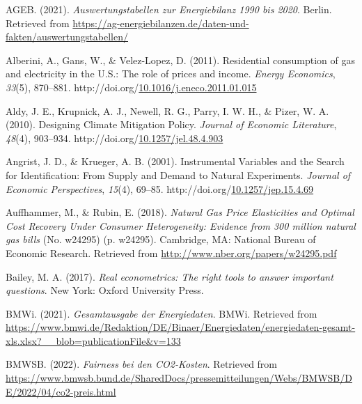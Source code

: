 \documentclass[12pt,twoside]{reedthesis}
\newlength{\cslhangindent}
\newenvironment{CSLReferences}[2] %
 {%
  \setlength{\parindent}{0pt}
  \ifodd #1 \everypar{\setlength{\hangindent}{\cslhangindent}}\ignorespaces\fi
  \ifnum #2 > 0
  \setlength{\parskip}{#2\baselineskip}
  \fi
 }%
 {}
\begin{document}
\hypertarget{refs}{}
\begin{CSLReferences}{1}{0}
\leavevmode{}%
AGEB. (2021). \emph{Auswertungstabellen zur Energiebilanz 1990 bis 2020}. Berlin. Retrieved from \url{https://ag-energiebilanzen.de/daten-und-fakten/auswertungstabellen/}

\leavevmode{}%
Alberini, A., Gans, W., \& Velez-Lopez, D. (2011). Residential consumption of gas and electricity in the U.S.: The role of prices and income. \emph{Energy Economics}, \emph{33}(5), 870--881. http://doi.org/\href{https://doi.org/10.1016/j.eneco.2011.01.015}{10.1016/j.eneco.2011.01.015}

\leavevmode{}%
Aldy, J. E., Krupnick, A. J., Newell, R. G., Parry, I. W. H., \& Pizer, W. A. (2010). Designing Climate Mitigation Policy. \emph{Journal of Economic Literature}, \emph{48}(4), 903--934. http://doi.org/\href{https://doi.org/10.1257/jel.48.4.903}{10.1257/jel.48.4.903}

\leavevmode{}%
Angrist, J. D., \& Krueger, A. B. (2001). Instrumental Variables and the Search for Identification: From Supply and Demand to Natural Experiments. \emph{Journal of Economic Perspectives}, \emph{15}(4), 69--85. http://doi.org/\href{https://doi.org/10.1257/jep.15.4.69}{10.1257/jep.15.4.69}

\leavevmode{}%
Auffhammer, M., \& Rubin, E. (2018). \emph{Natural Gas Price Elasticities and Optimal Cost Recovery Under Consumer Heterogeneity: Evidence from 300 million natural gas bills} (No. w24295) (p. w24295). Cambridge, MA: National Bureau of Economic Research. Retrieved from \url{http://www.nber.org/papers/w24295.pdf}

\leavevmode{}%
Bailey, M. A. (2017). \emph{Real econometrics: The right tools to answer important questions}. New York: Oxford University Press.

\leavevmode{}%
BMWi. (2021). \emph{Gesamtausgabe der Energiedaten}. BMWi. Retrieved from \url{https://www.bmwi.de/Redaktion/DE/Binaer/Energiedaten/energiedaten-gesamt-xls.xlsx?__blob=publicationFile\&v=133}

\leavevmode{}%
BMWSB. (2022). \emph{Fairness bei den CO2-Kosten}. Retrieved from \url{https://www.bmwsb.bund.de/SharedDocs/pressemitteilungen/Webs/BMWSB/DE/2022/04/co2-preis.html}


\end{CSLReferences}
\end{document}
